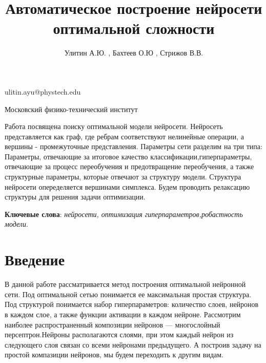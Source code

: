 \documentclass[12pt,twoside]{article}
\begin{document}
\title
    {Автоматическое построение нейросети оптимальной сложности}
\author
    {Улитин А.Ю. , Бахтеев О.Ю , Стрижов В.В.} %
\email
    {ulitin.ayu@phystech.edu}

\organization
    {Московский физико-технический институт}
\abstract
	{Работа посвящена поиску  оптимальной модели нейросети. Нейросеть представляется как граф, где ребрам соответствуют нелинейные операции, а вершины - промежуточные представления. Параметры сети разделим на три типа: Параметры, отвечающие за итоговое качество классификации,гиперпараметры, отвечающие за процесс переобучения и предотвращение переобучения, а также структурные параметры, которые отвечают за структуру  модели. Структура нейросети опеределяется вершинами симплекса. Будем проводить релаксацию структуры для решения задачи оптимизации. 


\bigskip
\textbf{Ключевые слова}: \emph {нейросети, оптимизация гиперпараметров,робастность модели}.

}

\maketitle

\section{Введение}
В данной работе рассматривается метод построения оптимальной нейронной сети. Под оптимальной сетью понимается ее максимальная простая структура. Под структурой понимается набор гиперпараметров: количество слоев, нейронов в каждом слое, а также функции активации в каждом нейроне. Рассмотрим наиболее распространенный композиции нейронов — многослойный персептрон.Нейроны располагаются слоями, при этом каждый нейрон из следующего слоя связан со всеми нейронами предыдущего. А построив задачу на простой компазиции нейронов, мы будем переходить к другим видам.
\end{document}
